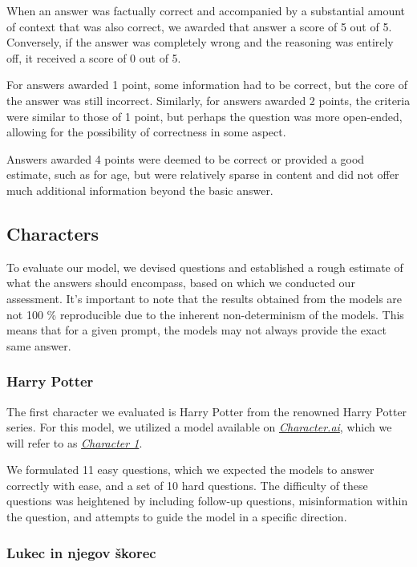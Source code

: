 \documentclass[fleqn,moreauthors,10pt]{ds_report}
\begin{document}
When an answer was factually correct and accompanied by a substantial amount of context that was also correct, we awarded that answer a score of 5 out of 5. Conversely, if the answer was completely wrong and the reasoning was entirely off, it received a score of 0 out of 5.

For answers awarded 1 point, some information had to be correct, but the core of the answer was still incorrect. Similarly, for answers awarded 2 points, the criteria were similar to those of 1 point, but perhaps the question was more open-ended, allowing for the possibility of correctness in some aspect.

Answers awarded 4 points were deemed to be correct or provided a good estimate, such as for age, but were relatively sparse in content and did not offer much additional information beyond the basic answer.

\subsection*{Characters}

To evaluate our model, we devised questions and established a rough estimate of what the answers should encompass, based on which we conducted our assessment. It's important to note that the results obtained from the models are not 100 \% reproducible due to the inherent non-determinism of the models. This means that for a given prompt, the models may not always provide the exact same answer.

\subsubsection*{Harry Potter}

The first character we evaluated is Harry Potter from the renowned Harry Potter series. For this model, we utilized a model available on \emph{\href{https://character.ai/}{Character.ai}}, which we will refer to as \emph{\href{https://character.ai/chat/suAUJzAPwFm-rDAAzKByHqAN64dYBg__lC_83ClfBzg}{Character 1}}.

We formulated 11 easy questions, which we expected the models to answer correctly with ease, and a set of 10 hard questions. The difficulty of these questions was heightened by including follow-up questions, misinformation within the question, and attempts to guide the model in a specific direction.

\subsubsection*{Lukec in njegov škorec}
\end{document}
